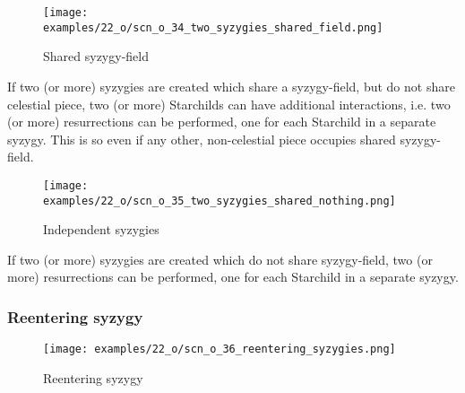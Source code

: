\clearpage %

\vspace*{-2.1\baselineskip}
\noindent
\begin{figure}[!h]
\texttt{[image: examples/22\_o/scn\_o\_34\_two\_syzygies\_shared\_field.png]}
\caption{Shared syzygy-field}
\label{fig:scn_o_34_two_syzygies_shared_field}
\end{figure}

If two (or more) syzygies are created which share a syzygy-field, but do not share celestial piece, two
(or more) Starchilds can have additional interactions, i.e. two (or more) resurrections can be performed,
one for each Starchild in a separate syzygy. This is so even if any other, non-celestial piece occupies
shared syzygy-field.

\clearpage %

\vspace*{-2.1\baselineskip}
\noindent
\begin{figure}[!h]
\texttt{[image: examples/22\_o/scn\_o\_35\_two\_syzygies\_shared\_nothing.png]}
\caption{Independent syzygies}
\label{fig:scn_o_35_two_syzygies_shared_nothing}
\end{figure}

If two (or more) syzygies are created which do not share syzygy-field, two (or more) resurrections can be
performed, one for each Starchild in a separate syzygy.

\clearpage %

\subsubsection*{Reentering syzygy}

\vspace*{-1.2\baselineskip}
\noindent
\begin{figure}[!h]
\texttt{[image: examples/22\_o/scn\_o\_36\_reentering\_syzygies.png]}
\caption{Reentering syzygy}
\label{fig:scn_o_36_reentering_syzygies}
\end{figure}

